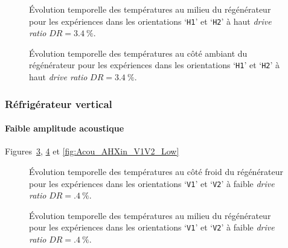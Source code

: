 \begin{figure}[!ht]
    \centering
    
    \caption{\'Evolution temporelle des températures au milieu du régénérateur pour les expériences dans les orientations `\texttt{H1}' et `\texttt{H2}' à haut \textit{drive ratio} $DR=\qty{3.4}{\percent}$.}
    \label{fig:Acou_Regmid_H1H2_High}
\end{figure}

\begin{figure}[!ht]
    \centering
    
    \caption{\'Evolution temporelle des températures au côté ambiant du régénérateur pour les expériences dans les orientations `\texttt{H1}' et `\texttt{H2}' à haut \textit{drive ratio} $DR=\qty{3.4}{\percent}$.}
    \label{fig:Acou_AHXin_H1H2_High}
\end{figure}

\subsubsection{Réfrigérateur vertical}
\paragraph{Faible amplitude acoustique} Figures~\ref{fig:Acou_CHXin_V1V2_Low}, \ref{fig:Acou_Regmid_V1V2_Low} et \ref{fig:Acou_AHXin_V1V2_Low}
\begin{figure}[!ht] %
    \centering
    
    \caption{\'Evolution temporelle des températures au côté froid du régénérateur pour les expériences dans les orientations `\texttt{V1}' et `\texttt{V2}' à faible \textit{drive ratio} $DR=\qty{.4}{\percent}$.}
    \label{fig:Acou_CHXin_V1V2_Low}
\end{figure}

\begin{figure}[!ht] %
    \centering
    
    \caption{\'Evolution temporelle des températures au milieu du régénérateur pour les expériences dans les orientations `\texttt{V1}' et `\texttt{V2}' à faible \textit{drive ratio} $DR=\qty{.4}{\percent}$.}
    \label{fig:Acou_Regmid_V1V2_Low}
\end{figure}

